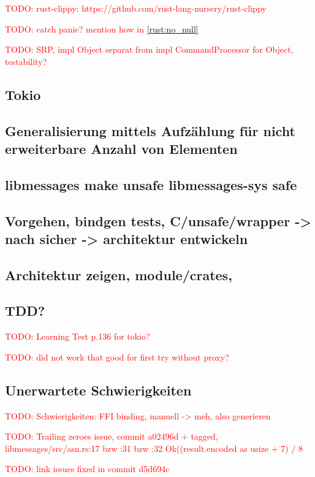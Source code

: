 \documentclass[
	12pt,
	table,
	bigheadings,
	ngerman,
	a4paper,
	BCOR5mm,
	DIV14,
	1.1headlines,
	pagesize,
	oneside,
	openright,
	titlepage,
	headsepline,
	nochapterprefix,
	bibtotoc,
	tocindent,
	listsindent,
	pointlessnumbers,
	cleardoubleempty,
	fleqn,
	halfparskip
]{scrbook}
\newcommand{\todo}[1]{\textcolor{red}{TODO: #1}}
\begin{document}
	\todo{rust-clippy: https://github.com/rust-lang-nursery/rust-clippy}
	
	\todo{catch panic? mention how in \autoref{rust:no_null}}
	
	\todo{SRP, impl Object separat from impl CommandProcessor for Object, testability?}
	
	\subsection{Tokio}
	
		\subsection{Generalisierung mittels Aufzählung für nicht erweiterbare Anzahl von Elementen}
		
		\subsection{libmessages make unsafe libmessages-sys safe}
		
		\subsection{Vorgehen, bindgen tests, C/unsafe/wrapper -> nach sicher ->  architektur entwickeln}
		
		\subsection{Architektur zeigen, module/crates, }
	
		\subsection{TDD?}
		\todo{Learning Test p.136 for tokio?}
		
		\todo{did not work that good for first try without proxy?}
		
		\subsection{Unerwartete Schwierigkeiten}
		\label{impl:issue:ffi}
		\todo{Schwierigkeiten: FFI binding, manuell -> meh, also generieren}
			
		\todo{Trailing zeroes issue, commit a02496d + tagged, libmessages/src/asn.rs:17 bzw :31 bzw :32 Ok((result.encoded as usize + 7) / 8}
		
		\todo{link issues fixed in commit d5d694c}
		
\end{document}
